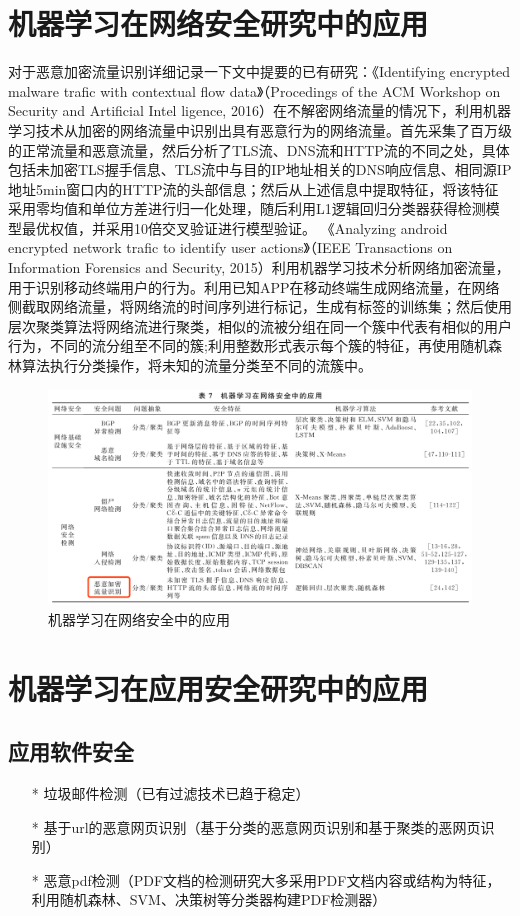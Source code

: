 \documentclass[UTF8]{ctexart}
\begin{document}
	\section{机器学习在网络安全研究中的应用}\label{sec:disijie}
	对于恶意加密流量识别详细记录一下文中提要的已有研究：《Identifying encrypted malware trafic with contextual flow data》（Procedings of the ACM Workshop on Security and Artificial Intel ligence, 2016）在不解密网络流量的情况下，利用机器学习技术从加密的网络流量中识别出具有恶意行为的网络流量。首先采集了百万级的正常流量和恶意流量，然后分析了TLS流、DNS流和HTTP流的不同之处，具体包括未加密TLS握手信息、TLS流中与目的IP地址相关的DNS响应信息、相同源IP地址5min窗口内的HTTP流的头部信息；然后从上述信息中提取特征，将该特征采用零均值和单位方差进行归一化处理，随后利用L1逻辑回归分类器获得检测模型最优权值，并采用10倍交叉验证进行模型验证。
	《Analyzing android encrypted network trafic to identify user actions》（IEEE Transactions on Information Forensics and Security, 2015）利用机器学习技术分析网络加密流量，用于识别移动终端用户的行为。利用已知APP在移动终端生成网络流量，在网络侧截取网络流量，将网络流的时间序列进行标记，生成有标签的训练集；然后使用层次聚类算法将网络流进行聚类，相似的流被分组在同一个簇中代表有相似的用户行为，不同的流分组至不同的簇;利用整数形式表示每个簇的特征，再使用随机森林算法执行分类操作，将未知的流量分类至不同的流簇中。
	\begin{figure}[ht]
        \centering
        \includegraphics[scale=0.5]{picture/007.png}
        \caption{机器学习在网络安全中的应用}
        \label{fig:007}
    \end{figure}
	\clearpage
	\section{机器学习在应用安全研究中的应用}\label{sec:diwujie}
	\subsection{应用软件安全}
	\begin{itemize}
	\item[*] 垃圾邮件检测（已有过滤技术已趋于稳定）
	\item[*] 基于url的恶意网页识别（基于分类的恶意网页识别和基于聚类的恶网页识别）
	\item[*]  恶意pdf检测（PDF文档的检测研究大多采用PDF文档内容或结构为特征，利用随机森林、SVM、决策树等分类器构建PDF检测器）
	\end{itemize}
\end{document}
